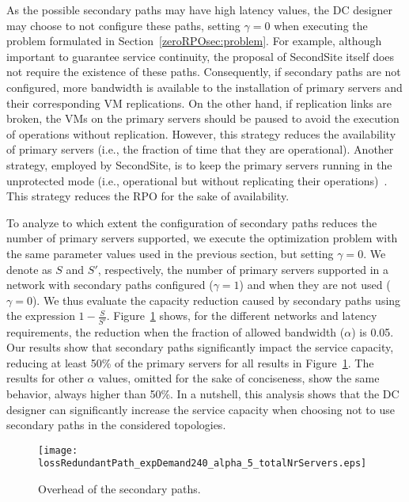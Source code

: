 \documentclass[preprint]{elsarticle}
\begin{document}
As the possible secondary paths may have high latency values, the DC designer may choose to not configure these paths, setting $\gamma = 0$ when executing the problem formulated in Section~\ref{zeroRPOsec:problem}. For example, although important to guarantee service continuity, the proposal of SecondSite itself does not require the existence of these paths. Consequently, if secondary paths are not configured, more bandwidth is available to the installation of primary servers and their corresponding VM replications. On the other hand, if replication links are broken, the VMs on the primary servers should be paused to avoid the execution of operations without replication. However, this strategy reduces the availability of primary servers (i.e., the fraction of time that they are operational). Another strategy, employed by SecondSite, is to keep the primary servers running in the unprotected mode (i.e., operational but without replicating their operations)~\cite{rajagopalan2012secondsite}. This strategy reduces the RPO for the sake of availability.

To analyze to which extent the configuration of secondary paths reduces the number of primary servers supported, we execute the optimization problem with the same parameter values used in the previous section, but setting $\gamma=0$. We denote as $S$ and $S'$, respectively, the number of primary servers supported in a network with secondary paths configured ($\gamma=1$) and when they are not used ($\gamma=0$). We thus evaluate the capacity reduction caused by secondary paths using the expression $1 -\frac{S}{S'}$. Figure~\ref{zeroRPOfig:comparisonWithoutRedundantServiceReduction} shows, for the different networks and latency requirements, the reduction when the fraction of allowed bandwidth ($\alpha$) is 0.05. Our results show that secondary paths significantly impact the service capacity, reducing at least 50\% of the primary servers for all results in Figure~\ref{zeroRPOfig:comparisonWithoutRedundantServiceReduction}. The results for other $\alpha$ values, omitted for the sake of conciseness, show the same behavior, always higher than 50\%. In a nutshell, this analysis shows that the DC designer can significantly increase the service capacity when choosing not to use secondary paths in the considered topologies.
\begin{figure}
\centering
\texttt{[image: lossRedundantPath\_expDemand240\_alpha\_5\_totalNrServers.eps]}
\caption{Overhead of the secondary paths.}
\label{zeroRPOfig:comparisonWithoutRedundantServiceReduction}
\end{figure} 
\end{document}
